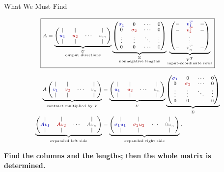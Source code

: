 \documentclass[10pt]{beamer}
\theoremstyle{definition}
\newcommand{\x}[1]{\alert{\textbf{#1}}}
\newcommand{\rd}[1]{{\color{red!70!black}#1}}
\newcommand{\bl}[1]{{\color{blue!70!black}#1}}
\newcommand{\gry}[1]{{\color{gray}#1}}
\newcommand{\Vcols}{\begin{pmatrix}|&|& &|\\ \bl{v_1}&\rd{v_2}&\cdots&\gry{v_n}\\ |&|& &|\end{pmatrix}}
\newcommand{\Ucols}{\begin{pmatrix}|&|& &|\\ \bl{u_1}&\rd{u_2}&\cdots&\gry{u_m}\\ |&|& &|\end{pmatrix}}
\newcommand{\Vrows}{\begin{pmatrix}-&\bl{v_1^T}&-\\ -&\rd{v_2^T}&-\\ &\vdots&\\ -&\gry{v_n^T}&-\end{pmatrix}}
\newcommand{\Sigdisplay}{\begin{pmatrix}\bl{\sigma_1}&0&\cdots&0\\ 0&\rd{\sigma_2}&\cdots&0\\ \vdots&\vdots&\ddots&\vdots\\ 0&0&\cdots&\gry{0}\end{pmatrix}}
\begin{document}
\begin{frame}[shrink=18]{What We Must Find}

\[
\scriptsize
\boxed{
A
=
\underbrace{\Ucols}_{\substack{U\\\text{output directions}}}
\underbrace{\Sigdisplay}_{\substack{\Sigma\\\text{nonnegative lengths}}}
\underbrace{\Vrows}_{\substack{V^T\\\text{input-coordinate rows}}}
}
\]

\vfill

\[
\scriptsize
\begin{aligned}
\underbrace{
A\Vcols
}_{\text{contract multiplied by }V}
&=
\underbrace{
\begin{pmatrix}|&|& &|\\
\bl{u_1}&\rd{u_2}&\cdots&\gry{u_n}\\
|&|& &|
\end{pmatrix}}_{U}
\underbrace{
\begin{pmatrix}
\bl{\sigma_1}&0&\cdots&0\\
0&\rd{\sigma_2}&\cdots&0\\
\vdots&\vdots&\ddots&\vdots\\
0&0&\cdots&\gry{0}
\end{pmatrix}}_{\Sigma}\\
\underbrace{
\begin{pmatrix}|&|& &|\\
\bl{Av_1}&\rd{Av_2}&\cdots&\gry{Av_n}\\
|&|& &|
\end{pmatrix}}_{\text{expanded left side}}
&=
\underbrace{
\begin{pmatrix}|&|& &|\\
\bl{\sigma_1u_1}&\rd{\sigma_2u_2}&\cdots&\gry{0u_n}\\
|&|& &|
\end{pmatrix}}_{\text{expanded right side}}.
\end{aligned}
\]

\vfill

\begin{center}
\x{Find the columns and the lengths; then the whole matrix is determined.}
\end{center}

\end{frame}
\end{document}

